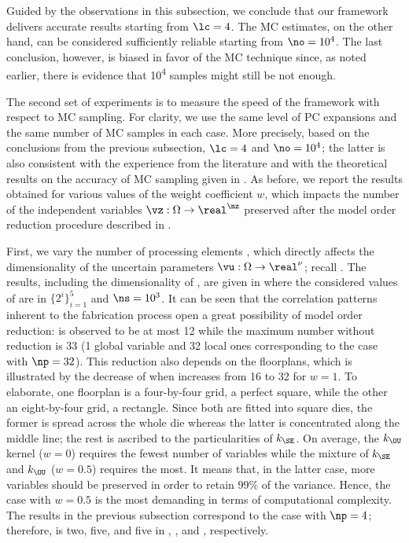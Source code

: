 Guided by the observations in this subsection, we conclude that our framework
delivers accurate results starting from $\lc = 4$. The \ac{MC} estimates, on the
other hand, can be considered sufficiently reliable starting from $\no = 10^4$.
The last conclusion, however, is biased in favor of the \ac{MC} technique since,
as noted earlier, there is evidence that 10\textsuperscript{4} samples might
still be not enough.


The second set of experiments is to measure the speed of the framework with
respect to \ac{MC} sampling. For clarity, we use the same level of \ac{PC}
expansions and the same number of \ac{MC} samples in each case. More precisely,
based on the conclusions from the previous subsection, $\lc = 4$ and $\no =
10^4$; the latter is also consistent with the experience from the literature
\cite{ghanta2006, bhardwaj2008, huang2009a, shen2009, lee2013} and with the
theoretical results on the accuracy of \ac{MC} sampling given in
\cite{diaz-emparanza2002}. As before, we report the results obtained for various
values of the weight coefficient $w$, which impacts the number of the
independent variables $\vz: \Omega \to \real^\nz$ preserved after the model
order reduction procedure described in .

First, we vary the number of processing elements \np, which directly affects the
dimensionality of the uncertain parameters $\vu: \Omega \to \real^\nu$; recall
. The results, including the dimensionality
\nz of \vz, are given in  where the
considered values of \np are in $\{ 2^i \}_{i = 1}^5$ and $\ns = 10^3$. It can
be seen that the correlation patterns inherent to the fabrication process
\cite{cheng2011} open a great possibility of model order reduction: \nz is
observed to be at most 12 while the maximum number without reduction is 33 (1
global variable and 32 local ones corresponding to the case with $\np = 32$).
This reduction also depends on the floorplans, which is illustrated by the
decrease of \nz when \np increases from 16 to 32 for $w = 1$. To elaborate, one
floorplan is a four-by-four grid, a perfect square, while the other an
eight-by-four grid, a rectangle. Since both are fitted into square dies, the
former is spread across the whole die whereas the latter is concentrated along
the middle line; the rest is ascribed to the particularities of $k_\SE$. On
average, the $k_\OU$ kernel ($w = 0$) requires the fewest number of variables
while the mixture of $k_\SE$ and $k_\OU$ ($w = 0.5$) requires the most. It means
that, in the latter case, more variables should be preserved in order to retain
99\% of the variance. Hence, the case with $w = 0.5$ is the most demanding in
terms of computational complexity. The results in the previous subsection
correspond to the case with $\np = 4$; therefore, \nz is two, five, and five in
, , and
, respectively.

